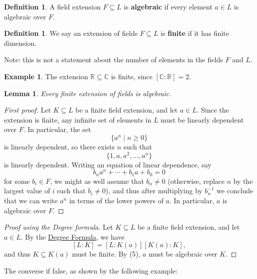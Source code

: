 \documentclass[12pt]{report}
\newtheorem{lemma}[theorem]{Lemma}
\numberwithin{equation}{section}
\numberwithin{theorem}{chapter}
\theoremstyle{definition}
\newtheorem{definition}[theorem]{Definition}
\newtheorem{example}[theorem]{Example}
\newtheorem*{basic properties}{Basic Properties}
\newtheorem*{Important Remark}{Important Remark}
\newcommand{\R}{\mathbb{R}}
\newcommand{\C}{\mathbb{C}}
\begin{document}
\begin{definition}
A field extension $F \subseteq L$ is {\bf algebraic} if every element $a \in L$ is algebraic over $F$.
\end{definition}

\begin{definition}
	We say an extension of fields $F \subseteq L$ is {\bf finite} if it has finite dimension.
\end{definition}

Note: this is not a statement about the number of elements in the fields $F$ and $L$.

\begin{example}
	The extension $\R \subseteq \C$ is finite, since $[\C : \R] = 2$.
\end{example}

\begin{lemma}\label{finite extension algebraic}
	Every finite extension of fields is algebraic.
\end{lemma}


\begin{proof}[First proof]
	Let $K \subseteq L$ be a finite field extension, and let $a \in L$. Since the extension is finite, any infinite set of elements in $L$ must be linearly dependent over $F$. In particular, the set
	$$\{ a^n \mid n \geqslant 0 \}$$
	is linearly dependent, so there exists $n$ such that
	$$\{ 1, a, a^2, \ldots, a^n \}$$
	is linearly dependent. Writing an equation of linear dependence, say
	$$b_n a^n + \cdots + b_1a + b_0 = 0$$
	for some $b_i \in F$, we might as well assume that $b_n \neq 0$ (otherwise, replace $n$ by the largest value of $i$ such that $b_i \neq 0$), and thus after multiplying by $b_n^{-1}$ we conclude that we can write $a^n$ in terms of the lower powers of $a$. In particular, $a$ is algebraic over $F$.	
\end{proof}

\begin{proof}[Proof using the Degree formula]
	Let $K \subseteq L$ be a finite field extension, and let $a \in L$. By the \hyperref[deg formula]{Degree Formula}, we have 
	$$[L : K] = [L : K(a)][K(a): K],$$
	and thus $K \subseteq K(a)$ must be finite. By  (5), $a$ must be algebraic over $K$.
\end{proof}


The converse if false, as shown by the following example:
\end{document}
